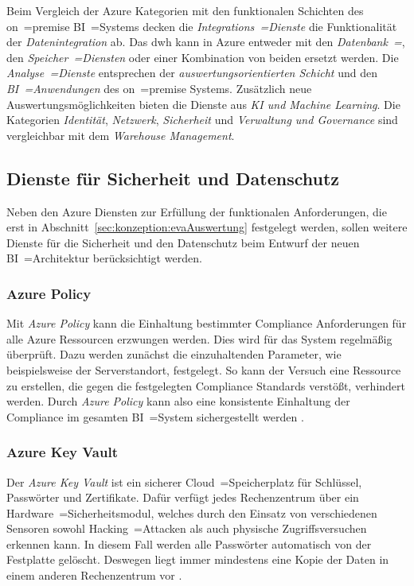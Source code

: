 Beim Vergleich der Azure Kategorien mit den funktionalen Schichten des on~=premise BI~=Systems decken die \textit{Integrations~=Dienste} die Funktionalität der \textit{Datenintegration} ab. Das \ac{dwh} kann in Azure entweder mit den \textit{Datenbank~=}, den \textit{Speicher~=Diensten} oder einer Kombination von beiden ersetzt werden. Die \textit{Analyse~=Dienste} entsprechen der \textit{auswertungsorientierten Schicht} und den \textit{BI~=Anwendungen} des on~=premise Systems. Zusätzlich neue Auswertungsmöglichkeiten bieten die Dienste aus \textit{KI und Machine Learning}. Die Kategorien \textit{Identität}, \textit{Netzwerk}, \textit{Sicherheit} und \textit{Verwaltung und Governance} sind vergleichbar mit dem \textit{Warehouse Management}.

\subsection{Dienste für Sicherheit und Datenschutz} \label{subsec:grundlagen:azure:sicherheitUndDatenschutz}
Neben den Azure Diensten zur Erfüllung der funktionalen Anforderungen, die erst in Abschnitt~\ref{sec:konzeption:evaAuswertung} festgelegt werden, sollen weitere Dienste für die Sicherheit und den Datenschutz beim Entwurf der neuen BI~=Architektur berücksichtigt werden.

\subsubsection{Azure Policy} \label{subsec:grundlagen:azure:sicherheitUndDatenschutz:ap}
Mit \textit{Azure Policy} kann die Einhaltung bestimmter Compliance Anforderungen für alle Azure Ressourcen erzwungen werden. Dies wird für das System regelmäßig überprüft. Dazu werden zunächst die einzuhaltenden Parameter, wie beispielsweise der Serverstandort, festgelegt. So kann der Versuch eine Ressource zu erstellen, die gegen die festgelegten Compliance Standards verstößt, verhindert werden. Durch \textit{Azure Policy} kann also eine konsistente Einhaltung der Compliance im gesamten BI~=System sichergestellt werden \cite{stefanovic_azure_2021}.

\subsubsection{Azure Key Vault} \label{subsec:grundlagen:azure:sicherheitUndDatenschutz:keyVault}
Der \textit{Azure Key Vault} ist ein sicherer Cloud~=Speicherplatz für Schlüssel, Passwörter und Zertifikate. Dafür verfügt jedes Rechenzentrum über ein Hardware~=Sicherheitsmodul, welches durch den Einsatz von verschiedenen Sensoren sowohl Hacking~=Attacken als auch physische Zugriffsversuchen erkennen kann. In diesem Fall werden alle Passwörter automatisch von der Festplatte gelöscht. Deswegen liegt immer mindestens eine Kopie der Daten in einem anderen Rechenzentrum vor \cite{haunts_key_2019}.

